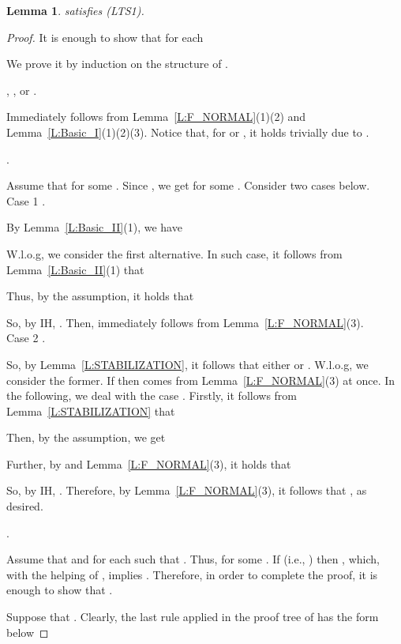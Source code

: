 \documentclass{elsarticle}
\theoremstyle{plain}
\newtheorem{lemma}[theorem]{Lemma}
\theoremstyle{definition}
\begin{document}
\begin{lemma}\label{L:LLTS_I}
    satisfies (LTS1).
\end{lemma}
\begin{proof}
 It is enough to show that for each 
    
    We prove it by induction on the structure of .


  \noindent  , ,  or .

        Immediately follows from Lemma~\ref{L:F_NORMAL}(1)(2) and Lemma~\ref{L:Basic_I}(1)(2)(3).
        Notice that, for  or , it holds trivially due to .

  \noindent  .

        Assume that  for some . Since , we get  for some .
        Consider two cases below.\\

       \noindent Case 1 .

        By Lemma~\ref{L:Basic_II}(1), we have
        
        W.l.o.g, we consider the first alternative.
        In such case, it follows from Lemma~\ref{L:Basic_II}(1) that
        
        Thus, by the assumption, it holds that
        
        So, by IH, .
        Then,  immediately follows from Lemma~\ref{L:F_NORMAL}(3).\\

       \noindent Case 2 .

        So, by Lemma~\ref{L:STABILIZATION}, it follows that either  or .
        W.l.o.g, we consider the former.
        If  then  comes from Lemma~\ref{L:F_NORMAL}(3) at once.
        In the following, we deal with the case .
        Firstly, it follows from Lemma~\ref{L:STABILIZATION} that
        
        Then, by the assumption, we get
        
        Further, by  and Lemma~\ref{L:F_NORMAL}(3), it holds that
         
        So, by IH, . Therefore, by Lemma~\ref{L:F_NORMAL}(3), it follows that , as desired.


  \noindent  .

        Assume that  and  for each  such that .
        Thus,  for some .
        If (i.e., ) then , which, with the helping of , implies . Therefore, in order to complete the proof, it is enough to show that .

        Suppose that . Clearly, the last rule applied in the proof tree of   has the form below
        

\end{proof}
\end{document}
